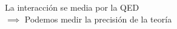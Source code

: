 \documentclass[preview]{standalone}
\begin{document}
\begin{center}
\begin{flushleft}La interacción se media por la QED \\ $\implies$ Podemos medir la precisión de la teoría\end{flushleft}
\end{center}
\end{document}
